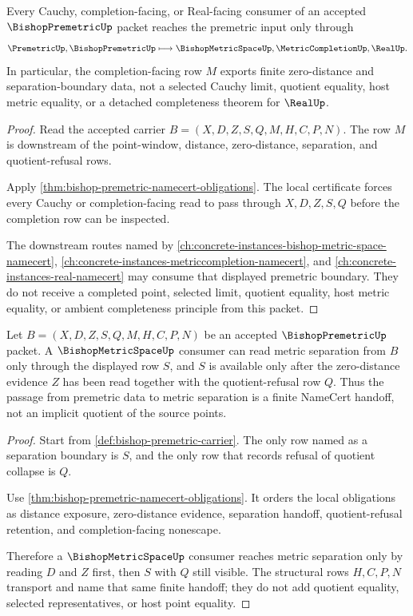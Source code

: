 \begin{theorem}
\label{thm:bishop-premetric-cauchy-route}
Every Cauchy, completion-facing, or Real-facing consumer of an accepted $\BishopPremetricUp$ packet reaches the premetric input only through
$$
\PremetricUp,\BishopPremetricUp \longmapsto \BishopMetricSpaceUp,\MetricCompletionUp,\RealUp .
$$
In particular, the completion-facing row $M$ exports finite zero-distance and separation-boundary data, not a selected Cauchy limit, quotient equality, host metric equality, or a detached completeness theorem for $\RealUp$.
\end{theorem}
\begin{proof}
Read the accepted carrier $B=(X,D,Z,S,Q,M,H,C,P,N)$. The row $M$ is downstream of the point-window, distance, zero-distance, separation, and quotient-refusal rows.

Apply \autoref{thm:bishop-premetric-namecert-obligations}. The local certificate forces every Cauchy or completion-facing read to pass through $X,D,Z,S,Q$ before the completion row can be inspected.

The downstream routes named by \autoref{ch:concrete-instances-bishop-metric-space-namecert}, \autoref{ch:concrete-instances-metriccompletion-namecert}, and \autoref{ch:concrete-instances-real-namecert} may consume that displayed premetric boundary. They do not receive a completed point, selected limit, quotient equality, host metric equality, or ambient completeness principle from this packet.
\end{proof}

\begin{theorem}
\label{thm:bishop-premetric-metric-separation-boundary}
Let $B=(X,D,Z,S,Q,M,H,C,P,N)$ be an accepted $\BishopPremetricUp$ packet. A $\BishopMetricSpaceUp$ consumer can read metric separation from $B$ only through the displayed row $S$, and $S$ is available only after the zero-distance evidence $Z$ has been read together with the quotient-refusal row $Q$. Thus the passage from premetric data to metric separation is a finite NameCert handoff, not an implicit quotient of the source points.
\end{theorem}
\begin{proof}
Start from \autoref{def:bishop-premetric-carrier}. The only row named as a separation boundary is $S$, and the only row that records refusal of quotient collapse is $Q$.

Use \autoref{thm:bishop-premetric-namecert-obligations}. It orders the local obligations as distance exposure, zero-distance evidence, separation handoff, quotient-refusal retention, and completion-facing nonescape.

Therefore a $\BishopMetricSpaceUp$ consumer reaches metric separation only by reading $D$ and $Z$ first, then $S$ with $Q$ still visible. The structural rows $H,C,P,N$ transport and name that same finite handoff; they do not add quotient equality, selected representatives, or host point equality.
\end{proof}

